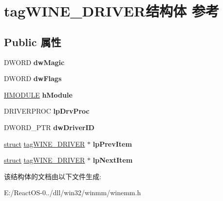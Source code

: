 \hypertarget{structtag_w_i_n_e___d_r_i_v_e_r}{}\section{tag\+W\+I\+N\+E\+\_\+\+D\+R\+I\+V\+E\+R结构体 参考}
\label{structtag_w_i_n_e___d_r_i_v_e_r}
\subsection*{Public 属性}
\begin{DoxyCompactItemize}
\item 
\mbox{\label{structtag_w_i_n_e___d_r_i_v_e_r_a111669862b9bd12af121da77d821169f}} 
D\+W\+O\+RD {\bfseries dw\+Magic}
\item 
\mbox{\label{structtag_w_i_n_e___d_r_i_v_e_r_a8de65a144fc3c5c262ea24ab9ce95122}} 
D\+W\+O\+RD {\bfseries dw\+Flags}
\item 
\mbox{\label{structtag_w_i_n_e___d_r_i_v_e_r_a1d3c66a3490f241bdd2bda999fdd6a49}} 
\hyperlink{interfacevoid}{H\+M\+O\+D\+U\+LE} {\bfseries h\+Module}
\item 
\mbox{\label{structtag_w_i_n_e___d_r_i_v_e_r_a26b3b19ec7ebead61b92700710bc1838}} 
D\+R\+I\+V\+E\+R\+P\+R\+OC {\bfseries lp\+Drv\+Proc}
\item 
\mbox{\label{structtag_w_i_n_e___d_r_i_v_e_r_a755d2d2335438104525c72012d2a29c4}} 
D\+W\+O\+R\+D\+\_\+\+P\+TR {\bfseries dw\+Driver\+ID}
\item 
\mbox{\label{structtag_w_i_n_e___d_r_i_v_e_r_a172855e177756e321181a4d855841b3e}} 
\hyperlink{interfacestruct}{struct} \hyperlink{structtag_w_i_n_e___d_r_i_v_e_r}{tag\+W\+I\+N\+E\+\_\+\+D\+R\+I\+V\+ER} $\ast$ {\bfseries lp\+Prev\+Item}
\item 
\mbox{\label{structtag_w_i_n_e___d_r_i_v_e_r_af1de654c80f91f6ee42997b291c65be0}} 
\hyperlink{interfacestruct}{struct} \hyperlink{structtag_w_i_n_e___d_r_i_v_e_r}{tag\+W\+I\+N\+E\+\_\+\+D\+R\+I\+V\+ER} $\ast$ {\bfseries lp\+Next\+Item}
\end{DoxyCompactItemize}


该结构体的文档由以下文件生成\+:\begin{DoxyCompactItemize}
\item 
E\+:/\+React\+O\+S-\/0../dll/win32/winmm/winemm.\+h\end{DoxyCompactItemize}
